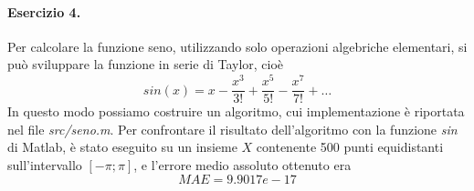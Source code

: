 \paragraph{Esercizio 4.} Per calcolare la funzione seno, utilizzando solo operazioni algebriche elementari, si può sviluppare la funzione in serie di Taylor, cioè
\[
sin(x) = x - \frac{x^3}{3!} + \frac{x^5}{5!} - \frac{x^7}{7!} + \ldots
\]
In questo modo possiamo costruire un algoritmo, cui implementazione è riportata nel file \emph{src/seno.m}. Per confrontare il risultato dell'algoritmo con la funzione \emph{sin} di Matlab, è stato eseguito su un insieme $X$ contenente 500 punti equidistanti sull'intervallo $[-\pi; \pi]$, e l'errore medio assoluto ottenuto era
\[
MAE = 9.9017e-17
\]
